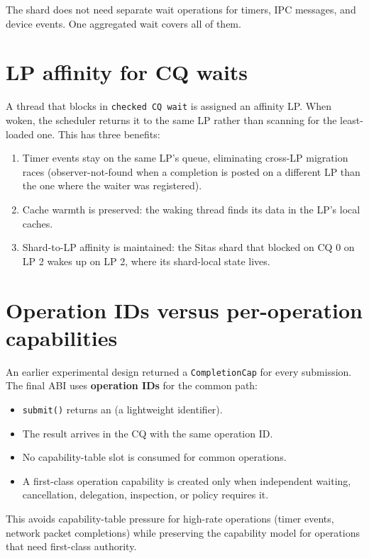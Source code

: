 The shard does not need separate wait operations for timers, IPC messages, and
device events. One aggregated wait covers all of them.

\section{LP affinity for CQ waits}

A thread that blocks in \texttt{checked CQ wait} is assigned an affinity LP. When woken,
the scheduler returns it to the same LP rather than scanning for the least-loaded
one. This has three benefits:

\begin{enumerate}
    \item Timer events stay on the same LP's queue, eliminating
        cross-LP migration races (observer-not-found when a completion is posted
        on a different LP than the one where the waiter was registered).
    \item Cache warmth is preserved: the waking thread finds its data
        in the LP's local caches.
    \item Shard-to-LP affinity is maintained: the Sitas shard that blocked
        on CQ 0 on LP 2 wakes up on LP 2, where its shard-local state lives.
\end{enumerate}

\section{Operation IDs versus per-operation capabilities}

An earlier experimental design returned a \texttt{CompletionCap} for every
submission. The final ABI uses \textbf{operation IDs} for the common path:

\begin{itemize}
    \item \texttt{submit()} returns an  (a lightweight identifier).
    \item The result arrives in the CQ with the same operation ID.
    \item No capability-table slot is consumed for common operations.
    \item A first-class operation capability is created only when independent
        waiting, cancellation, delegation, inspection, or policy requires it.
\end{itemize}

This avoids capability-table pressure for high-rate operations (timer events,
network packet completions) while preserving the capability model for operations
that need first-class authority.

